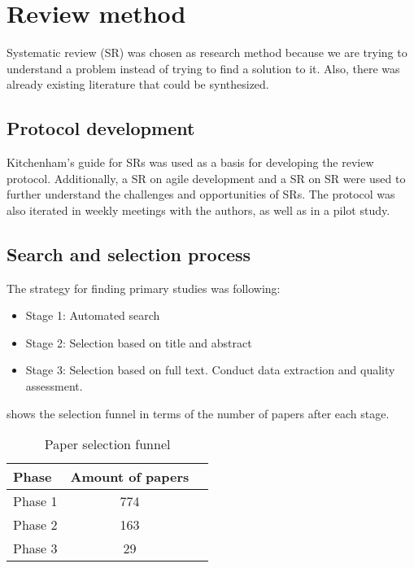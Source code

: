 \documentclass{sig-alternate}
\begin{document}
\section{Review method}
\label{sec:Method}
Systematic review (SR) was chosen as research method because we are trying to
understand a problem instead of trying to find a solution to it. Also, there was already
existing literature that could be synthesized.

\subsection{Protocol development}
Kitchenham's guide for SRs \cite{kitchenham2004procedures} was used as a basis
for developing the review protocol. Additionally, a SR on agile development
\cite{dyba_empirical_2008} and a SR on SR \cite{kitchenham2013systematic} were
used to further understand the challenges and opportunities of SRs. The
protocol was also iterated in weekly meetings with the authors, as well as in a pilot study.

\subsection{Search and selection process}

The strategy for finding primary studies was following:

\begin{itemize}
  \item Stage 1: Automated search
  \item Stage 2: Selection based on title and abstract
  \item Stage 3: Selection based on full text. Conduct data
  extraction and quality assessment.
\end{itemize}

 shows the selection funnel in terms of the number
of papers after each stage.


\begin{table}
\centering
\caption{Paper selection funnel}
\begin{tabular}{|l|c|r} \hline
\label{SelectionFunnel}
\textbf{Phase} & \textbf{Amount of papers} \\ \hline
Phase 1 & 774 \\ \hline 
Phase 2 & 163 \\ \hline
Phase 3 & 29\\
\hline
\end{tabular}
\end{table}
\end{document}
